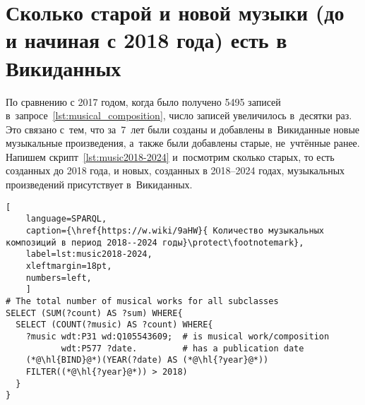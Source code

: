 



\section{Сколько старой и новой музыки (до и начиная с 2018 года) есть в Викиданных}

По сравнению с 2017 годом, когда было получено 5495 записей в~запросе~\ref{lst:musical_composition}, 
число записей увеличилось в~десятки раз. 
Это связано с~тем, что за~7~лет были созданы и добавлены в~Викиданные новые музыкальные произведения, 
а~также были добавлены старые, не~учтённые ранее. 
Напишем скрипт~\ref{lst:music2018-2024} и~посмотрим сколько 
старых, то есть созданных до 2018 года, и новых, созданных в 2018--2024 годах, 
музыкальных произведений присутствует в~Викиданных.

\begin{lstlisting}[ 
    language=SPARQL,
    caption={\href{https://w.wiki/9aHW}{ Количество музыкальных композиций в период 2018--2024 годы}\protect\footnotemark},
    label=lst:music2018-2024,
    xleftmargin=18pt,
    numbers=left,
    ]
# The total number of musical works for all subclasses 
SELECT (SUM(?count) AS ?sum) WHERE{
  SELECT (COUNT(?music) AS ?count) WHERE{
    ?music wdt:P31 wd:Q105543609;  # is musical work/composition
           wdt:P577 ?date.         # has a publication date
    (*@\hl{BIND}@*)(YEAR(?date) AS (*@\hl{?year}@*))
    FILTER((*@\hl{?year}@*)) > 2018)
  }
}
\end{lstlisting}%


